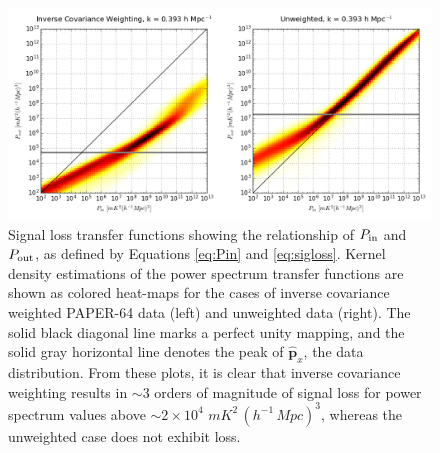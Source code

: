 \documentclass[preprint2,numberedappendix,tighten]{aastex6}  %
\begin{document}

\begin{figure}
	\centering
	\includegraphics[width=1\textwidth]{plots/sigloss_transfercurve.png}
	\caption{Signal loss transfer functions showing the relationship of $P_{\rm in}$ and $P_{\rm out}$, as defined by Equations \eqref{eq:Pin} and \eqref{eq:sigloss}. Kernel density estimations of the power spectrum transfer functions are shown as colored 
heat-maps for the cases of inverse covariance weighted PAPER-64 data (left) and unweighted data (right). The solid black 
diagonal line marks a perfect unity mapping, and the solid gray horizontal line denotes the peak of $\hat{\textbf{p}}_{x}$, the data 
distribution. From these plots, it is clear that inverse covariance weighting results in $\sim3$ orders of magnitude of signal loss 
for power spectrum values above $\sim$$2 \times 10^{4}$ $mK^{2} \, (h^{-1} \, Mpc)^{3}$, whereas the unweighted case does 
not exhibit loss.}
	\label{fig:sigloss_transfercurve}
\end{figure}
\end{document}
